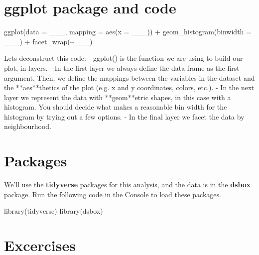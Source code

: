 \documentclass[
]{book}
\newenvironment{Shaded}{\begin{snugshade}}{\end{snugshade}}
\newcommand{\AttributeTok}[1]{\textcolor[rgb]{0.77,0.63,0.00}{#1}}
\newcommand{\FunctionTok}[1]{\textcolor[rgb]{0.00,0.00,0.00}{#1}}
\newcommand{\NormalTok}[1]{#1}
\newcommand{\SpecialCharTok}[1]{\textcolor[rgb]{0.00,0.00,0.00}{#1}}
\newcommand{\StringTok}[1]{\textcolor[rgb]{0.31,0.60,0.02}{#1}}
\begin{document}
\hypertarget{ggplot-package-and-code}{%
\section{ggplot package and code}\label{ggplot-package-and-code}}

\begin{Shaded}
\begin{Highlighting}[]
\FunctionTok{ggplot}\NormalTok{(}\AttributeTok{data =}\NormalTok{ \_\_\_, }\AttributeTok{mapping =} \FunctionTok{aes}\NormalTok{(}\AttributeTok{x =}\NormalTok{ \_\_\_)) }\SpecialCharTok{+}
  \FunctionTok{geom\_histogram}\NormalTok{(}\AttributeTok{binwidth =}\NormalTok{ \_\_\_) }\SpecialCharTok{+}
  \FunctionTok{facet\_wrap}\NormalTok{(}\SpecialCharTok{\textasciitilde{}}\NormalTok{\_\_\_)}

\NormalTok{Let}\StringTok{\textquotesingle{}s deconstruct this code: }
\StringTok{{-} \textasciigrave{}ggplot()\textasciigrave{} is the function we are using to build our plot, in layers.}
\StringTok{{-} In the first layer we always define the data frame as the first argument. Then, we define the mappings between the variables in the dataset and the **aes**thetics of the plot (e.g. x and y coordinates, colors, etc.). }
\StringTok{{-} In the next layer we represent the data with **geom**etric shapes, in this case with a histogram. You should decide what makes a reasonable bin width for the histogram by trying out a few options.}
\StringTok{{-} In the final layer we facet the data by neighbourhood.}
\end{Highlighting}
\end{Shaded}

\hypertarget{packages}{%
\section{Packages}\label{packages}}

We'll use the \textbf{tidyverse} packages for this analysis, and the data is in the \textbf{dsbox} package. Run the following code in the Console to load these packages.

\begin{Shaded}
\begin{Highlighting}[]
\FunctionTok{library}\NormalTok{(tidyverse)}
\FunctionTok{library}\NormalTok{(dsbox)}
\end{Highlighting}
\end{Shaded}

\hypertarget{excercises}{%
\section{Excercises}\label{excercises}}
\end{document}
